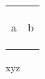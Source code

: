 \documentclass[ngerman]{letter}
\begin{document}
\begin{tabular}{l l}
a & \begin{small} b \end{small}
\end{tabular}
xyz
\end{document}
